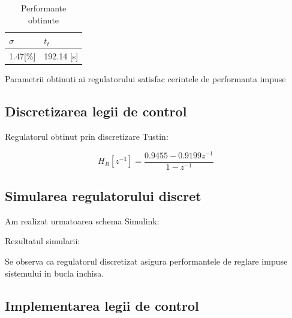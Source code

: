 \documentclass[12pt,english]{article}
\begin{document}
\begin{table}[H]
  \centering
  \begin{tabular}{|l|l|}
    \hline
    $\sigma$ & $t_t$ \\
    \hline
    1.47[\%] & 192.14 [s] \\
    \hline
  \end{tabular}
  \caption{Performante obtinute}
\end{table}

Parametrii obtinuti ai regulatorului satisfac cerintele de performanta impuse

\subsection {Discretizarea legii de control}
Regulatorul obtinut prin discretizare Tustin:

\begin{equation*}
H_{R}\left[ z^{-1}\right] =\frac{0.9455-0.9199z^{-1}}{1-z^{-1}}
\end{equation*}

\subsection {Simularea regulatorului discret}

Am realizat urmatoarea schema Simulink:

\begin{figure}[H]
  \centering
\end{figure}

Rezultatul simularii:
\begin{figure}[H]
  \centering
\end{figure}

Se observa ca regulatorul discretizat asigura performantele de reglare impuse sistemului in bucla inchisa.

\subsection {Implementarea legii de control}
\end{document}
